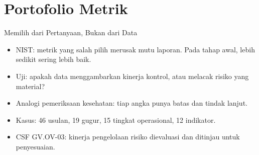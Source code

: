 \documentclass[aspectratio=169, table, 12pt]{beamer}
\begin{document}
\section{Portofolio Metrik}

\begin{frame}{{\Large Memilih dari Pertanyaan, Bukan dari Data}}
  \vspace{6pt}
  \small
  \begin{itemize}
    \item NIST: metrik yang salah pilih merusak mutu laporan. Pada tahap awal, lebih sedikit
          sering lebih baik.
    \item Uji: apakah data menggambarkan kinerja kontrol, atau melacak risiko yang material?
    \item Analogi pemeriksaan kesehatan: tiap angka punya batas dan tindak lanjut.
    \item Kasus: 46 usulan, 19 gugur, 15 tingkat operasional, 12 indikator.
    \item CSF GV.OV-03: kinerja pengelolaan risiko dievaluasi dan ditinjau untuk penyesuaian.
  \end{itemize}
\end{frame}
\end{document}
